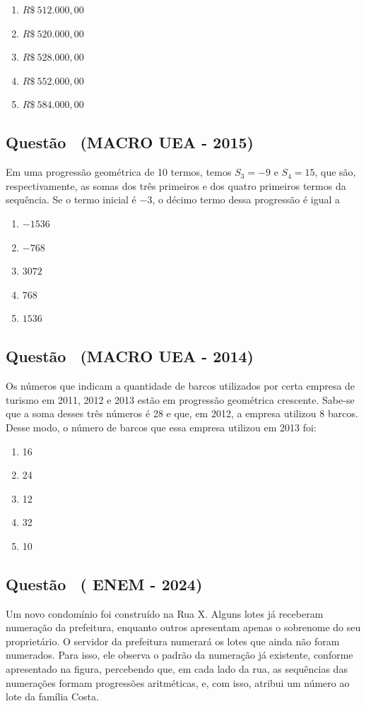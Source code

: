 \documentclass[12pt]{article}
\newcounter{questao}
\newcommand{\novaquestao}[1]{%
  \stepcounter{questao}%
  \subsection*{Questão \thequestao\ (#1)}%
}
\begin{document}
\begin{multicols}{2}
        
            \begin{enumerate}[label=(\alph*), noitemsep]
                \item $R\$\ 512.000,00$
                \item $R\$\ 520.000,00$
                \item $R\$\ 528.000,00$
                \item $R\$\ 552.000,00$
                \item $R\$\ 584.000,00$
            \end{enumerate}

        \novaquestao{MACRO UEA - 2015}
            Em uma progressão geométrica de 10 termos, temos $S_{3}= -9$ e $S_{4}= 15$, que são, respectivamente, as somas dos três primeiros e dos quatro primeiros termos da sequência. Se o termo inicial é $-3$, o décimo termo dessa progressão é igual a
        
            \begin{enumerate}[label=(\alph*), noitemsep]
                \item $-1536$
                \item $-768$
                \item $3072$
                \item $768$
                \item $1536$
            \end{enumerate}

        \novaquestao{MACRO UEA - 2014}
            Os números que indicam a quantidade de barcos utilizados por certa empresa de turismo em 2011, 2012 e 2013 estão em progressão geométrica crescente. Sabe-se que a soma desses três números é 28 e que, em 2012, a empresa utilizou 8 barcos. Desse modo, o número de barcos que essa empresa utilizou em 2013 foi:

            \begin{enumerate}[label=(\alph*), noitemsep]
                \item 16
                \item 24
                \item 12
                \item 32
                \item 10 
            \end{enumerate}
        

        \novaquestao{ ENEM - 2024}
            Um novo condomínio foi construído na Rua X. Alguns lotes já receberam numeração da prefeitura, enquanto outros apresentam apenas o sobrenome do seu proprietário. O servidor da prefeitura numerará os lotes que ainda não foram numerados. Para isso, ele observa o padrão da numeração já existente, conforme apresentado na figura, percebendo que, em cada lado da rua, as sequências das numerações formam progressões aritméticas, e, com isso, atribui um número ao lote da família Costa.


\end{multicols}
\end{document}
